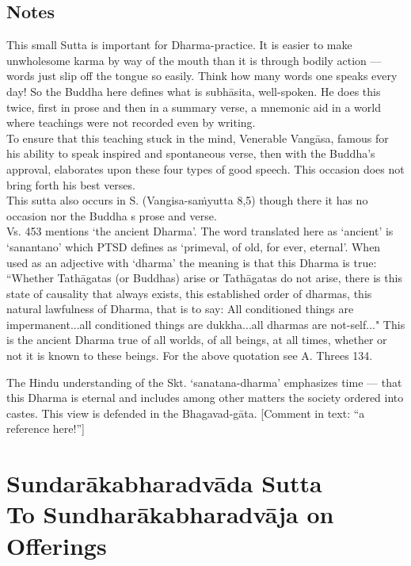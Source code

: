 \section{Notes}
This small Sutta is important for Dharma-practice. It is easier to make unwholesome karma by way of the mouth than it is through bodily action — words just slip off the tongue so easily. Think how many words one speaks every day! So the Buddha here defines what is subh\=asita, well-spoken. He does this twice, first in prose and then in a summary verse, a mnemonic aid in a world where teachings were not recorded even by writing.\\

To ensure that this teaching stuck in the mind, Venerable Vang\=asa, famous for his ability to speak inspired and spontaneous verse, then with the Buddha's approval, elaborates upon these four types of good speech. This occasion does not bring forth his best verses.\\

This sutta also occurs in S. (Vangisa-sa\.myutta 8,5) though there it has no occasion nor the Buddha s prose and verse.\\

Vs. 453 mentions `the ancient Dharma'. The word translated here as `ancient' is `sanantano' which PTSD defines as `primeval, of old, for ever, eternal'. When used as an adjective with `dharma' the meaning is that this Dharma is true: ``Whether Tath\=agatas (or Buddhas) arise or Tath\=agatas do not arise, there is this state of causality that always exists, this established order of dharmas, this natural lawfulness of Dharma, that is to say: All conditioned things are impermanent...all conditioned things are dukkha...all dharmas are not-self..." This is the ancient Dharma true of all worlds, of all beings, at all times, whether or not it is known to these beings. For the above quotation see A. Threes 134.

The Hindu understanding of the Skt. `sanatana-dharma' emphasizes time — that this Dharma is eternal and includes among other matters the society ordered into castes. This view is defended in the Bhagavad-g\=ata. [Comment in text: “a reference here!”]

\chapter{Sundar\=akabharadv\=ada Sutta\\ To Sundhar\=akabharadv\=aja on Offerings}

